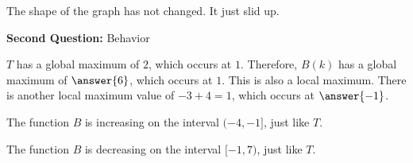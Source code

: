 \documentclass{ximera}
\begin{document}
\begin{example}
\begin{image}
\end{image}


The shape of the graph has not changed.  It just slid up.



\textbf{\textcolor{purple!85!blue}{Second Question:}}  Behavior


\begin{question}   


$T$ has a global maximum of $2$, which occurs at $1$.  Therefore, $B(k)$ has a global maximum of $\answer{6}$, which occurs at $1$.  This is also a local maximum.  There is another local maximum value of $-3+4=1$, which occurs at $\answer{-1}$.
\end{question}

The function $B$ is increasing on the interval $(-4,-1]$, just like $T$. 

The function $B$ is decreasing on the interval $[-1, 7)$, just like $T$.

\end{example}
\end{document}
